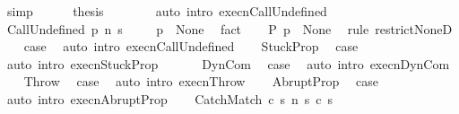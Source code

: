 \begin{isabellebody}
\ simp\isanewline
\ \ \ \ \isamarkupfalse%
\ {\isacharquery}thesis\isanewline
\ \ \ \ \ \ \isamarkupfalse%
\ {\isacharparenleft}auto\ intro{\isacharcolon}\ execn{\isachardot}CallUndefined{\isacharparenright}\isanewline
\ \ \isamarkupfalse%
\isanewline
{}\isamarkupfalse%
\isanewline
\ \ \isamarkupfalse%
\ {\isacharparenleft}CallUndefined\ p\ n\ s{\isacharparenright}\isanewline
\ \ \isamarkupfalse%
\ {\isachardoublequoteopen}{\isasymGamma}\ p\ {\isacharequal}\ None{\isachardoublequoteclose}\ \isamarkupfalse%
\ fact\isanewline
\ \ \isamarkupfalse%
\ {\isachardoublequoteopen}{\isacharparenleft}{\isasymGamma}{\isacharbar}\isactrlbsub P\isactrlesub {\isacharparenright}\ p\ {\isacharequal}\ None{\isachardoublequoteclose}\ \isamarkupfalse%
\ {\isacharparenleft}rule\ restrict{\isacharunderscore}NoneD{\isacharparenright}\isanewline
\ \ \isamarkupfalse%
\ {\isacharquery}case\ \isamarkupfalse%
\ {\isacharparenleft}auto\ intro{\isacharcolon}\ execn{\isachardot}CallUndefined{\isacharparenright}\isanewline
{}\isamarkupfalse%
\isanewline
\ \ \isamarkupfalse%
\ StuckProp\ \isamarkupfalse%
\ {\isacharquery}case\ \isamarkupfalse%
\ {\isacharparenleft}auto\ intro{\isacharcolon}\ execn{\isachardot}StuckProp{\isacharparenright}\isanewline
{}\isamarkupfalse%
\ \ \isanewline
\ \ \isamarkupfalse%
\ DynCom\ \isamarkupfalse%
\ {\isacharquery}case\ \isamarkupfalse%
\ {\isacharparenleft}auto\ intro{\isacharcolon}\ execn{\isachardot}DynCom{\isacharparenright}\isanewline
{}\isamarkupfalse%
\isanewline
\ \ \isamarkupfalse%
\ Throw\ \isamarkupfalse%
\ {\isacharquery}case\ \isamarkupfalse%
\ {\isacharparenleft}auto\ intro{\isacharcolon}\ execn{\isachardot}Throw{\isacharparenright}\isanewline
{}\isamarkupfalse%
\isanewline
\ \ \isamarkupfalse%
\ AbruptProp\ \isamarkupfalse%
\ {\isacharquery}case\ \isamarkupfalse%
\ {\isacharparenleft}auto\ intro{\isacharcolon}\ execn{\isachardot}AbruptProp{\isacharparenright}\isanewline
{}\isamarkupfalse%
\isanewline
\ \ \isamarkupfalse%
\ {\isacharparenleft}CatchMatch\ c{}\ s\ n\ s{\isacharprime}\ c{}\ s{\isacharprime}{\isacharprime}{\isacharparenright}\ \isanewline
\ \ \isamarkupfalse%

\end{isabellebody}
